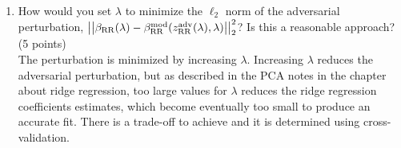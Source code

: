 \documentclass[11pt,twoside]{article}
\begin{document}
\begin{exam}
\begin{exercise}
\begin{problem}
\begin{enumerate}
\item How would you set $\lambda$ to minimize the $\ell_2$ norm of the adversarial perturbation, $\left|\left| \beta_{\operatorname{RR}}(\lambda) - \beta^{\operatorname{mod}}_{\operatorname{RR}}(z^{\operatorname{adv}}_{\operatorname{RR}}(\lambda),\lambda)  \right|\right| _{2}^2$? Is this a reasonable approach?  (5 points)\\

The perturbation is minimized by increasing $\lambda$. 
Increasing $\lambda$ reduces the  adversarial perturbation, but as described in the PCA notes in the chapter about ridge regression, too large values for $\lambda$ reduces the ridge regression coefficients estimates, which become eventually too small
to produce an accurate fit. There is a trade-off to achieve and it is determined using cross-validation.

 \end{enumerate}

\end{problem}

\end{exercise}


\end{exam}
\end{document}
